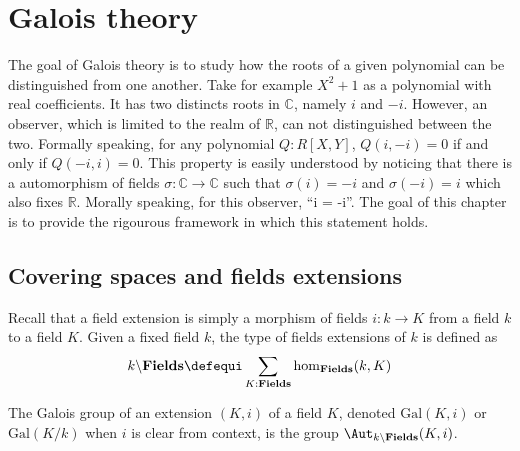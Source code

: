 \chapter{Galois theory}%
\label{chap:galois-theory}%

The goal of Galois theory is to study how the roots of a given polynomial can
be distinguished from one another. Take for example $X^2+1$ as a polynomial
with real coefficients. It has two distincts roots in $\mathbb C$, namely $i$
and $-i$. However, an observer, which is limited to the realm of $\mathbb R$,
can not distinguished between the two. Formally speaking, for any polynomial
$Q: R[X,Y]$, $Q(i,-i) = 0$ if and only if $Q(-i,i) = 0$. This property is
easily understood by noticing that there is a automorphism of fields $\sigma:
\mathbb C  \to \mathbb C$ such that $\sigma(i) = -i$ and $\sigma(-i) = i$ which
also fixes $\mathbb R$. Morally speaking, for this observer, ``i = -i''. The
goal of this chapter is to provide the rigourous framework in which this
statement holds.

\section{Covering spaces and fields extensions}
\label{sec:cover-spac-fields}

\def\fieldstype{\mathbf{Fields}}%
\def\Gal{\mathrm{Gal}}%
\def\fieldshom{\hom_{\fieldstype}}%
\def\isHom{\mathrm{isHom}}%
\def\iso{\mathrm{Iso}}%
\newcommand\restr[1]{{{#1}^\ast}}%
\newcommand\fieldsext[1]{#1\backslash\fieldstype}%
Recall that a field extension is simply a morphism of fields $i: k\to K$ from a
field $k$ to a field $K$. Given a fixed field $k$, the type of fields
extensions of $k$ is defined as
\begin{displaymath}
  \fieldsext k \defequi \sum_{K:\fieldstype}\fieldshom(k,K)
\end{displaymath}

\begin{definition}
  The Galois group of an extension $(K,i)$ of a field $K$, denoted $\Gal(K,i)$
  or $\Gal(K/k)$ when $i$ is clear from context, is the group
  $\Aut_{\fieldsext k}{(K,i)}$.
  \label{def:galois-group}
\end{definition}

